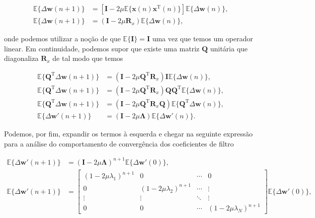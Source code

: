 \documentclass[a4paper,10pt]{article}
\begin{document}
\begin{enumerate}
\begin{enumerate}
						\begin{align}
							\mathbb{E}\{\Delta \mathbf{w}(n + 1)\} &= \left[ \mathbf{I} - 2 \mu \mathbb{E}\{\mathbf{x}(n) \mathbf{x}^{\text{T}}(n)\} \right] \mathbb{E}\{\Delta \mathbf{w}(n)\}, \\
							\mathbb{E}\{\Delta \mathbf{w}(n + 1)\} &= \left( \mathbf{I} - 2 \mu \mathbf{R}_{x} \right) \mathbb{E}\{\Delta \mathbf{w}(n)\},
						\end{align}

						onde podemos utilizar a noção de que $\mathbb{E}\{ \mathbf{I} \} = \mathbf{I}$ uma vez que temos um operador linear. Em continuidade, podemos supor que existe uma matriz $\mathbf{Q}$ unitária que diagonaliza $\mathbf{R}_{x}$
						de tal modo que temos 

						\begin{align}
							\mathbb{E}\{ \mathbf{Q}^{\text{T}} \Delta \mathbf{w}(n + 1) \} &= \left( \mathbf{I} - 2 \mu \mathbf{Q}^{\text{T}} \mathbf{R}_{x} \right) \mathbf{I} \mathbb{E}\{ \Delta \mathbf{w}(n)\}, \\
							\mathbb{E}\{ \mathbf{Q}^{\text{T}} \Delta \mathbf{w}(n + 1) \} &= \left( \mathbf{I} - 2 \mu \mathbf{Q}^{\text{T}} \mathbf{R}_{x} \right) \mathbf{Q} \mathbf{Q}^{\text{T}} \mathbb{E}\{ \Delta \mathbf{w}(n)\}, \\
							\mathbb{E}\{ \mathbf{Q}^{\text{T}} \Delta \mathbf{w}(n + 1) \} &= \left( \mathbf{I} - 2 \mu \mathbf{Q}^{\text{T}} \mathbf{R}_{x} \mathbf{Q} \right) \mathbb{E}\{ \mathbf{Q}^{\text{T}} \Delta \mathbf{w}(n)\}, \\
							\mathbb{E}\{\Delta \mathbf{w}'(n + 1)\} &= \left( \mathbf{I} - 2 \mu \mathbf{\Lambda} \right) \mathbb{E}\{\Delta \mathbf{w}'(n)\}.
						\end{align}

						Podemos, por fim, expandir os termos à esquerda e chegar na seguinte expressão para a análise do comportamento de convergência dos coeficientes de filtro

						\begin{align}
							\mathbb{E}\{ \Delta \mathbf{w}'(n + 1) \} &= \left( \mathbf{I} - 2 \mu \mathbf{\Lambda} \right)^{n + 1} \mathbb{E}\{\Delta \mathbf{w}'(0)\}, \\
							\mathbb{E}\{ \Delta \mathbf{w}'(n + 1) \} &= 
							\begin{bmatrix}
								(1 - 2 \mu \lambda_{1})^{n + 1} & 0 & \cdots & 0 \\
								0 & (1 - 2 \mu \lambda_{2})^{n + 1} & \cdots & \vdots \\
								\vdots & \vdots & \ddots & \vdots \\
								0 & 0 & \cdots & (1 - 2 \mu \lambda_{N})^{n + 1}
							\end{bmatrix} 
							\mathbb{E}\{ \Delta \mathbf{w}'(0)\},	
						\end{align}


\end{enumerate}
\end{enumerate}
\end{document}

